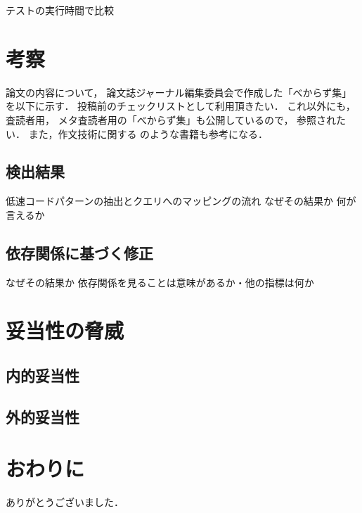 \documentclass[submit,techrep,noauthor]{ipsj}
\begin{document}
テストの実行時間で比較


\section{考察}
\label{sec5:format}

論文の内容について，
論文誌ジャーナル編集委員会で作成した「べからず集」を以下に示す．
投稿前のチェックリストとして利用頂きたい．
これ以外にも，査読者用，
メタ査読者用の「べからず集」\cite{webpage2}も公開しているので，
参照されたい．
また，作文技術に関する \cite{book1, book2, book3, book4}のような書籍も参考になる．



\subsection{検出結果}

低速コードパターンの抽出とクエリへのマッピングの流れ
なぜその結果か
何が言えるか

\subsection{依存関係に基づく修正}

なぜその結果か
依存関係を見ることは意味があるか・他の指標は何か

\section{妥当性の脅威}
\label{sec6:format}

\subsection{内的妥当性}


\subsection{外的妥当性}


\section{おわりに}
\label{sec7:format}


\begin{acknowledgment}
ありがとうございました．
\end{acknowledgment}
\end{document}
